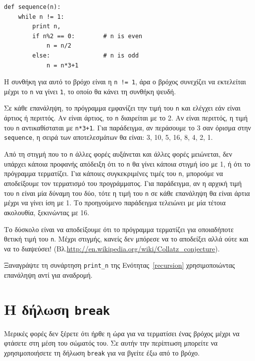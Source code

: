 \documentclass[10pt]{book}
\begin{document}
\begin{verbatim}
def sequence(n):
    while n != 1:
        print n,
        if n%2 == 0:        # n is even
            n = n/2
        else:               # n is odd
            n = n*3+1
\end{verbatim}
%

Η συνθήκη για αυτό το βρόχο είναι η {\tt n != 1}, άρα ο βρόχος
συνεχίζει να εκτελείται μέχρι το {\tt n} να γίνει {\tt 1},
το οποίο θα κάνει τη συνθήκη ψευδή.

Σε κάθε επανάληψη, το πρόγραμμα εμφανίζει την τιμή του {\tt n} 
και ελέγχει εάν είναι άρτιος ή περιττός. Αν είναι άρτιος, το {\tt n} 
διαιρείται με το 2. Αν είναι περιττός, η τιμή του {\tt n} αντικαθίσταται
με {\tt n*3+1}. Για παράδειγμα, αν περάσουμε το 3 σαν όρισμα στην
{\tt sequence}, η σειρά των αποτελεσμάτων θα είναι: 3, 10, 5, 16, 8, 4, 2, 1.

Από τη στιγμή που το {\tt n} άλλες φορές αυξάνεται και άλλες φορές
μειώνεται, δεν υπάρχει κάποια προφανής απόδειξη ότι το {\tt n} θα γίνει
κάποια στιγμή ίσο με 1, ή ότι το πρόγραμμα τερματίζει. Για κάποιες συγκεκριμένες τιμές του {\tt n}, μπορούμε να αποδείξουμε τον τερματισμό του προγράμματος. Για παράδειγμα, αν η αρχική τιμή του {\tt n} είναι μία δύναμη του δύο, τότε η τιμή του {\tt n} σε κάθε επανάληψη θα είναι άρτια μέχρι να γίνει ίση με 1. Το προηγούμενο παράδειγμα τελειώνει με μία τέτοια ακολουθία, ξεκινώντας με 16.

Το δύσκολο είναι να αποδείξουμε ότι το πρόγραμμα τερματίζει για οποιαδήποτε
θετική τιμή του {\tt n}. Μέχρι στιγμής, κανείς δεν μπόρεσε να το αποδείξει αλλά 
ούτε και να το διαψεύσει! (Βλ.\url{http://en.wikipedia.org/wiki/Collatz_conjecture}).
\\
\begin{exercise}

Ξαναγράψτε τη συνάρτηση \verb"print_n" της Ενότητας~\ref{recursion} 
χρησιμοποιώντας επανάληψη αντί για αναδρομή.
\end{exercise}


\section{Η δήλωση \tt break}


Μερικές φορές δεν ξέρετε ότι ήρθε η ώρα για να τερματίσει ένας βρόχος μέχρι να
φτάσετε στη μέση του σώματός του. Σε αυτήν την περίπτωση μπορείτε να χρησιμοποιήσετε τη δήλωση {\tt break} για να βγείτε έξω από το βρόχο.
\end{document}
